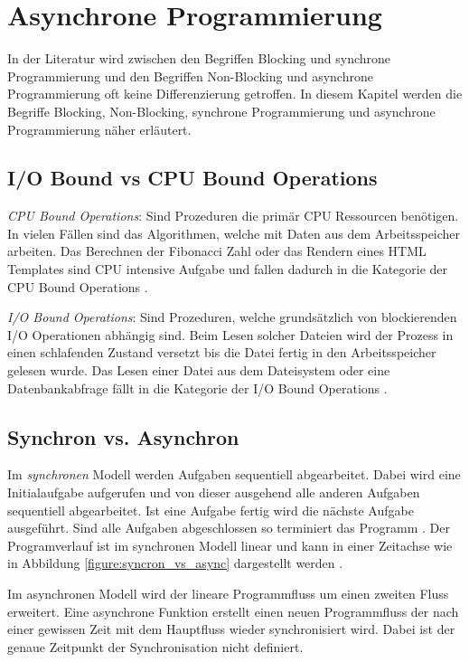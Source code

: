 \section{Asynchrone Programmierung}

In der Literatur wird zwischen den Begriffen Blocking und synchrone Programmierung und den Begriffen Non-Blocking und asynchrone Programmierung oft keine Differenzierung getroffen. In diesem Kapitel werden die Begriffe Blocking, Non-Blocking, synchrone Programmierung und asynchrone Programmierung näher erläutert. 

\subsection{I/O Bound vs CPU Bound Operations}

\emph{CPU Bound Operations}: Sind Prozeduren die primär CPU Ressourcen benötigen. In vielen Fällen sind das Algorithmen, welche mit Daten aus dem Arbeitsspeicher arbeiten. Das Berechnen der Fibonacci Zahl oder das Rendern eines HTML Templates sind CPU intensive Aufgabe und fallen dadurch in die Kategorie der CPU Bound Operations \cite[p. 70]{Erb2012}. 

\emph{I/O Bound Operations}: Sind Prozeduren, welche grundsätzlich von blockierenden I/O Operationen abhängig sind. Beim Lesen solcher Dateien wird der Prozess in einen schlafenden Zustand versetzt bis die Datei fertig in den Arbeitsspeicher gelesen wurde. Das Lesen einer Datei aus dem Dateisystem oder eine Datenbankabfrage fällt in die Kategorie der I/O Bound Operations \cite[p. 70]{Erb2012}. 

\subsection{Synchron vs. Asynchron}

Im \emph{synchronen} Modell werden Aufgaben sequentiell abgearbeitet. Dabei wird eine Initialaufgabe aufgerufen und von dieser ausgehend alle anderen Aufgaben sequentiell abgearbeitet. Ist eine Aufgabe fertig wird die nächste Aufgabe ausgeführt. Sind alle Aufgaben abgeschlossen so terminiert das Programm . Der Programverlauf ist im synchronen Modell linear und kann in einer Zeitachse wie in Abbildung \ref{figure:syncron_vs_async} dargestellt werden \cite[]{Pet2015}.

Im asynchronen Modell wird der lineare Programmfluss um einen zweiten Fluss erweitert. Eine asynchrone Funktion erstellt einen neuen Programmfluss der nach einer gewissen Zeit mit dem Hauptfluss wieder synchronisiert wird. Dabei ist der genaue Zeitpunkt der Synchronisation nicht definiert. 

